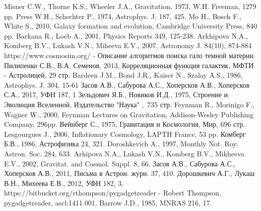 \documentclass[11pt]{article}
\begin{document}
\begin{thebibliography}{9}
Misner C.W., Thorne K.S., Wheeler J.A., Gravitation, 1973, W.H. Freeman, 1279 pp.
Press W.H., Schechter P., 1974, Astrophys. J. 187, 425.
Mo H., Bosch F., White S., 2010, Galaxy formation and evolution,  Cambridge University Press, 840 pp.
Barkana R., Loeb A., 2001, Physics Reports 349, 125-238.
Arkhipova N.A., Komberg B.V., Lukash V.N., Miheeva E.V., 2007, Astronomy J. 84(10), 874-884
https://www.cosmosim.org/ - Описание алгоритмов поиска гало темной материи.
Пилипенко С.В., В.А. Семенов, 2013, Корреляционная функция галактик, МФТИ - Астролицей, 29 стр.
Bardeen J.M., Bond J.R., Kaiser N., Szalay A.S., 1986, Astrophys. J.  304, 15-61
Засов А.В., Сабурова А.С., Хоперсков А.В., Хоперсков С.А., 2017, УФН 187, 1
Зельдович Я.Б., Новиков И.Д., 1975, Строение и Эволюция Вселенной, Издательство "Наука" $,$ 735 стр.
Feynman R., Morinigo F., Wagner W., 2000, Feynman Lectures on Gravitation, Addison-Wesley Publishing Company, 296pp.
Вейнберг С., 1975, Гравитация и Космология, Мир, 696 стр.
Lesgourgues J., 2006, Inflationary Cosmology, LAPTH France, 53 pp.
Комберг Б.В., 1986, Астрофизика 24, 321.
Doroshkevich A., 1997, Monthly Not. Roy. Astron. Soc. 284, 633.
Arhipova N.A., Lukash V.N., Komberg B.V., Mikheeva E.V., 2002, Gravitat. and Cosmol. Suppl. 8, 66.
Засов А.В., Сабурова А.С., Хоперсков А.В., 2011, Письма в Астрон. журн. 37, 410.
Дорошкевич А.Г., Лукаш В.Н., Михеева Е.В., 2012, УФН 182, 3.
https://bitbucket.org/rthompson/pygadgetreader - Robert Thompson, pygadgetreader, ascl:1411.001.
Barrow J.D., 1985, MNRAS 216, 17.
\end{thebibliography}
\end{document}
